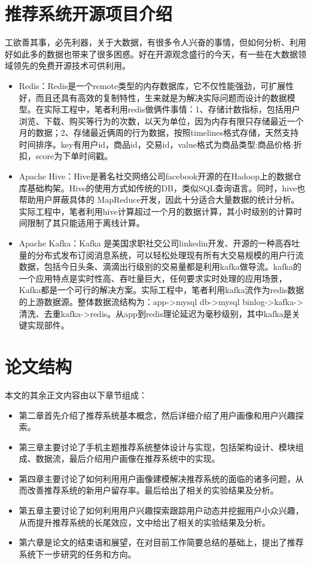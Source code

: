\section{推荐系统开源项目介绍}
工欲善其事，必先利器，关于大数据，有很多令人兴奋的事情，但如何分析、利用好如此多的数据也带来了很多困惑。好在开源观念盛行的今天，有一些在大数据领域领先的免费开源技术可供利用。
\begin{itemize}
	\item Redis：Redis是一个remote类型的内存数据库，它不仅性能强劲，可扩展性好，而且还具有高效的复制特性，生来就是为解决实际问题而设计的数据模型。在实际工程中，笔者利用redis做俩件事情：1、存储计数指标，包括用户浏览、下载、购买等行为的次数，以天为单位，因为内存有限只存储最近一个月的数据；2、存储最近俩周的行为数据，按照timelines格式存储，天然支持时间排序。key有用户id，商品id，交易id，value格式为商品类型:商品价格:折扣，score为下单时间戳。
	\item Apache Hive：Hive是著名社交网络公司facebook开源的在Hadoop上的数据仓库基础构架。Hive的使用方式如传统的DB，类似SQL查询语言。同时，hive也帮助用户屏蔽具体的 MapReduce开发，因此十分适合大量数据的统计分析。实际工程中，笔者利用hive计算超过一个月的数据计算，其小时级别的计算时间限制了其只能适用于离线计算。
	\item Apache Kafka：Kafka 是美国求职社交公司linkedin开发、开源的一种高吞吐量的分布式发布订阅消息系统，可以轻松处理现有所有大交易规模的用户行流数据，包括今日头条、滴滴出行级别的交易量都是利用kafka做导流。kafka的一个应用特点是实时性高、吞吐量巨大，任何要求实时处理的应用场景，Kafka都是一个可行的解决方案。实际工程中，笔者利用kafka流作为redis数据的上游数据源。整体数据流结构为：app->mysql db->mysql binlog->kafka->清洗、去重kafka->redis。从app到redis理论延迟为毫秒级别，其中kafka是关键实现部件。
\end{itemize}

\section{论文结构}
	本文的其余正文内容由以下章节组成：
	\begin{itemize}
		\item 第二章首先介绍了推荐系统基本概念，然后详细介绍了用户画像和用户兴趣探索。
		\item 第三章主要讨论了手机主题推荐系统整体设计与实现，包括架构设计、模块组成、数据流，最后介绍用户画像在推荐系统中的实现。
		\item 第四章主要讨论了如何利用用户画像建模解决推荐系统的面临的诸多问题，从而改善推荐系统的新用户留存率。最后给出了相关的实验结果及分析。
		\item 第五章主要讨论了如何利用用户兴趣探索跟踪用户动态并挖掘用户小众兴趣，从而提升推荐系统的长尾效应，文中给出了相关的实验结果及分析。
		\item 第六章是论文的结束语和展望，在对目前工作简要总结的基础上，提出了推荐系统下一步研究的任务和方向。
	\end{itemize}